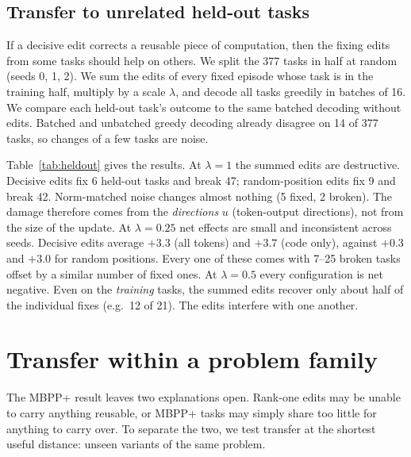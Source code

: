 \documentclass[11pt]{article}
\begin{document}
\subsection{Transfer to unrelated held-out tasks}
If a decisive edit corrects a reusable piece of computation, then the fixing edits from some tasks should help on others. We split the 377 tasks in half at random (seeds 0, 1, 2). We sum the edits of every fixed episode whose task is in the training half, multiply by a scale $\lambda$, and decode all tasks greedily in batches of 16. We compare each held-out task's outcome to the same batched decoding without edits. Batched and unbatched greedy decoding already disagree on 14 of 377 tasks, so changes of a few tasks are noise.

Table~\ref{tab:heldout} gives the results. At $\lambda{=}1$ the summed edits are destructive. Decisive edits fix 6 held-out tasks and break 47; random-position edits fix 9 and break 42. Norm-matched noise changes almost nothing (5 fixed, 2 broken). The damage therefore comes from the \emph{directions} $u$ (token-output directions), not from the size of the update. At $\lambda{=}0.25$ net effects are small and inconsistent across seeds. Decisive edits average $+3.3$ (all tokens) and $+3.7$ (code only), against $+0.3$ and $+3.0$ for random positions. Every one of these comes with 7--25 broken tasks offset by a similar number of fixed ones. At $\lambda{=}0.5$ every configuration is net negative. Even on the \emph{training} tasks, the summed edits recover only about half of the individual fixes (e.g.\ 12 of 21). The edits interfere with one another.

\begin{table}[t]
\centering
\small

\caption{Held-out transfer. The fixing edits of training-half tasks are summed, scaled, and applied, and the held-out half is decoded greedily. ``Fixed/broke'' counts held-out tasks that change from fail to pass or from pass to fail (seed 0). ``Net'' is fixed minus broke for seeds 0/1/2. A dash means the configuration was not run.}
\label{tab:heldout}
\end{table}

\section{Transfer within a problem family}
\label{sec:variants}
The MBPP+ result leaves two explanations open. Rank-one edits may be unable to carry anything reusable, or MBPP+ tasks may simply share too little for anything to carry over. To separate the two, we test transfer at the shortest useful distance: unseen variants of the same problem.
\end{document}

